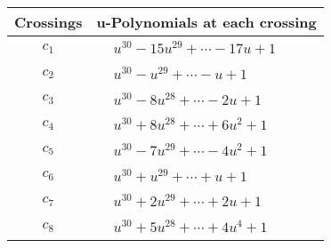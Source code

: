 \documentclass[1p]{elsarticle_modified}
\theoremstyle{definition}
\begin{document}
\begin{tabular}{m{50pt}|m{274pt}}
Crossings & \hspace{64pt}u-Polynomials at each crossing \\
\hline $$\begin{aligned}c_{1}\end{aligned}$$&$\begin{aligned}
&u^{30}-15 u^{29}+\cdots-17 u+1
\end{aligned}$\\
\hline $$\begin{aligned}c_{2}\end{aligned}$$&$\begin{aligned}
&u^{30}- u^{29}+\cdots- u+1
\end{aligned}$\\
\hline $$\begin{aligned}c_{3}\end{aligned}$$&$\begin{aligned}
&u^{30}-8 u^{28}+\cdots-2 u+1
\end{aligned}$\\
\hline $$\begin{aligned}c_{4}\end{aligned}$$&$\begin{aligned}
&u^{30}+8 u^{28}+\cdots+6 u^2+1
\end{aligned}$\\
\hline $$\begin{aligned}c_{5}\end{aligned}$$&$\begin{aligned}
&u^{30}-7 u^{29}+\cdots-4 u^2+1
\end{aligned}$\\
\hline $$\begin{aligned}c_{6}\end{aligned}$$&$\begin{aligned}
&u^{30}+u^{29}+\cdots+u+1
\end{aligned}$\\
\hline $$\begin{aligned}c_{7}\end{aligned}$$&$\begin{aligned}
&u^{30}+2 u^{29}+\cdots+2 u+1
\end{aligned}$\\
\hline $$\begin{aligned}c_{8}\end{aligned}$$&$\begin{aligned}
&u^{30}+5 u^{28}+\cdots+4 u^4+1
\end{aligned}$\\

\end{tabular}
\end{document}
